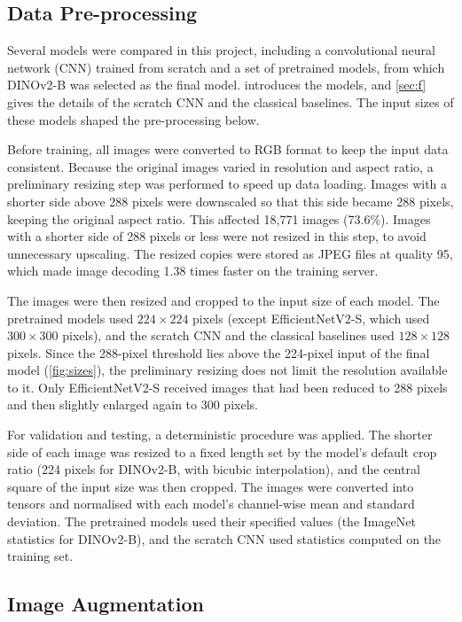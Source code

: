 \documentclass[11pt,a4paper]{article}
\newcommand{\pct}[1]{#1\%}
\begin{document}
\subsection*{Data Pre-processing}

Several models were compared in this project, including a convolutional neural network (CNN) trained from scratch and a set of pretrained models, from which DINOv2-B was selected as the final model.  introduces the models, and \cref{sec:f} gives the details of the scratch CNN and the classical baselines. The input sizes of these models shaped the pre-processing below.

Before training, all images were converted to RGB format to keep the input data consistent. Because the original images varied in resolution and aspect ratio, a preliminary resizing step was performed to speed up data loading. Images with a shorter side above 288 pixels were downscaled so that this side became 288 pixels, keeping the original aspect ratio. This affected 18,771 images (\pct{73.6}). Images with a shorter side of 288 pixels or less were not resized in this step, to avoid unnecessary upscaling. The resized copies were stored as JPEG files at quality 95, which made image decoding 1.38 times faster on the training server.

The images were then resized and cropped to the input size of each model. The pretrained models used $224 \times 224$ pixels (except EfficientNetV2-S, which used $300 \times 300$ pixels), and the scratch CNN and the classical baselines used $128 \times 128$ pixels. Since the 288-pixel threshold lies above the 224-pixel input of the final model (\cref{fig:sizes}), the preliminary resizing does not limit the resolution available to it. Only EfficientNetV2-S received images that had been reduced to 288 pixels and then slightly enlarged again to 300 pixels.

For validation and testing, a deterministic procedure was applied. The shorter side of each image was resized to a fixed length set by the model's default crop ratio (224 pixels for DINOv2-B, with bicubic interpolation), and the central square of the input size was then cropped. The images were converted into tensors and normalised with each model's channel-wise mean and standard deviation. The pretrained models used their specified values (the ImageNet statistics for DINOv2-B), and the scratch CNN used statistics computed on the training set.

\subsection*{Image Augmentation}
\end{document}
